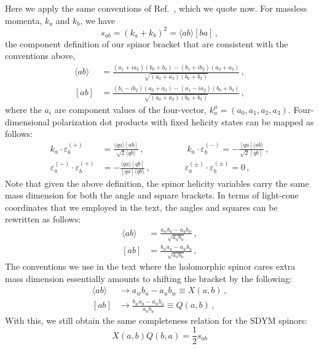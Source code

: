 \documentclass[11pt,letter]{article}
\begin{document}
Here we apply the same conventions of Ref.~\cite{jjmcTASI2014}, which we quote now. For massless momenta, $k_a$ and $k_b$, we have 
\begin{equation}
s_{ab} = (k_a+k_b)^2= \langle ab \rangle[ba]\,,
\end{equation}
the component definition of our spinor bracket that are consistent with the conventions above,
\begin{align}
\langle ab \rangle &= \frac{(a_1 + i a_2)(b_0+b_3)-(b_1 + i b_2)(a_0+a_3)}{\sqrt{(a_0+a_3)(b_0+b_3)}}\,,
\\
[ab] &= \frac{(b_1 - i b_2)(a_0+a_3)-(a_1 - i a_2)(b_0+b_3)}{\sqrt{(a_0+a_3)(b_0+b_3)}}\,,
\end{align}
where the $a_i$ are component values of the four-vector, $k^\mu_a = (a_0,a_1,a_2,a_3)$. Four-dimensional polarization dot products with fixed helicity states can be mapped as follows:
\begin{equation}\label{eq:4DPols}
\begin{aligned}
k_a \cdot \varepsilon_b^{(+)} &= \frac{\langle q a \rangle[ab]}{\sqrt{2}\langle q b\rangle}\,,
\qquad\quad \qquad
k_a \cdot \varepsilon_b^{(-)} = -\frac{[qa]\langle ab\rangle}{\sqrt{2}[qb]}\,,
\\
\varepsilon_a^{(-)}\cdot \varepsilon_b^{(+)} &= - \frac{\langle q a\rangle [qb]}{ [qa]\langle q b\rangle} \,,
\qquad \qquad
\varepsilon_a^{(\pm)}\cdot \varepsilon_b^{(\pm)} = 0 \,,
\end{aligned}
\end{equation}
Note that given the above definition, the spinor helicity variables carry the same mass dimension for both the angle and square brackets. In terms of light-cone coordinates that we employed in the text, the angles and squares can be rewritten as follows:
\begin{align}
\langle ab \rangle &= \frac{a_w b_u-a_u b_w}{\sqrt{a_ub_u}}\,,
\\
[ab] &= \frac{b_{\bar{w}}a_u-a_{\bar{w}}b_u}{\sqrt{a_ub_u}}\,,
\end{align}
The conventions we use in the text where the holomorphic spinor cares extra mass dimension essentially amounts to shifting the bracket by the following:
\begin{align}
\langle ab \rangle &\rightarrow a_w b_u-a_u b_w \equiv X(a,b)\,,
\\
[ab] &\rightarrow \frac{b_{\bar{w}}a_u-a_{\bar{w}}b_u}{a_ub_u}\equiv Q(a,b)\,,
\end{align}
With this, we still obtain the same completeness relation for the SDYM spinors:
\begin{equation}
X(a,b)Q(b,a) = \frac{1}{2}s_{ab}
\end{equation}
\end{document}
